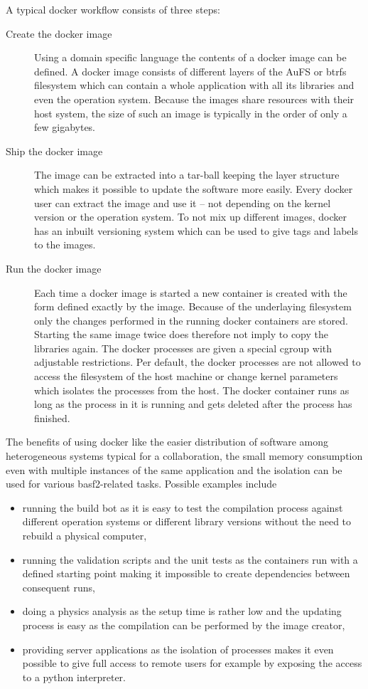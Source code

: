 A typical docker workflow consists of three steps:
\begin{description}
  \item[Create the docker image] Using a domain specific language the contents of a docker image can be defined. A docker image consists of different layers of the AuFS or btrfs filesystem which can contain a whole application with all its libraries and even the operation system. Because the images share resources with their host system, the size of such an image is typically in the order of only a few gigabytes.
  \item[Ship the docker image] The image can be extracted into a tar-ball keeping the layer structure which makes it possible to update the software more easily. Every docker user can extract the image and use it -- not depending on the kernel version or the operation system. To not mix up different images, docker has an inbuilt versioning system which can be used to give tags and labels to the images.
  \item[Run the docker image] Each time a docker image is started a new container is created with the form defined exactly by the image. Because of the underlaying filesystem only the changes performed in the running docker containers are stored. Starting the same image twice does therefore not imply to copy the libraries again. The docker processes are given a special cgroup with adjustable restrictions. Per default, the docker processes are not allowed to access the filesystem of the host machine or change kernel parameters which isolates the processes from the host. The docker container runs as long as the process in it is running and gets deleted after the process has finished.
\end{description}

The benefits of using docker like the easier distribution of software among heterogeneous systems typical for a collaboration, the small memory consumption even with multiple instances of the same application and the isolation can be used for various basf2-related tasks. Possible examples include
\begin{itemize}
 \item running the build bot as it is easy to test the compilation process against different operation systems or different library versions without the need to rebuild a physical computer,
 \item running the validation scripts and the unit tests as the containers run with a defined starting point making it impossible to create dependencies between consequent runs,
 \item doing a physics analysis as the setup time is rather low and the updating process is easy as the compilation can be performed by the image creator,
 \item providing server applications as the isolation of processes makes it even possible to give full access to remote users for example by exposing the access to a python interpreter.
\end{itemize}

